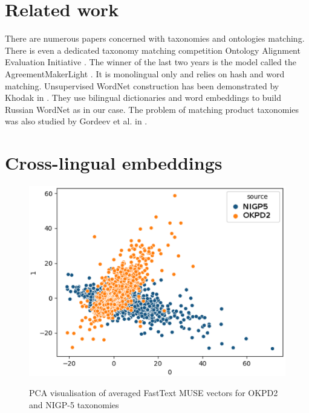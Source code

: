 \documentclass[11pt,a4paper]{article}
\begin{document}
\section{Related work}
There are numerous papers concerned with taxonomies and ontologies matching. There is even a dedicated taxonomy matching competition Ontology Alignment Evaluation Initiative \cite{ontology-sota}. The winner of the last two years is the model called the AgreementMakerLight \cite{faria}. It is monolingual only and relies on hash and word matching. Unsupervised WordNet construction has been demonstrated by Khodak in \citeyearpar{Khodak2017}. They use bilingual dictionaries and word embeddings to build Russian WordNet as in our case. The problem of matching product taxonomies was also studied by Gordeev et al. in \citeyearpar{gordeev-fruct}.

\section{Cross-lingual embeddings}

\begin{figure}
	
	\centering
	\small
	\includegraphics[scale=0.5]{tsne_new}\\

	\caption{PCA visualisation of averaged FastText MUSE vectors for OKPD2 and NIGP-5 taxonomies}
	\label{original-doc2vec}
\end{figure}
\end{document}
